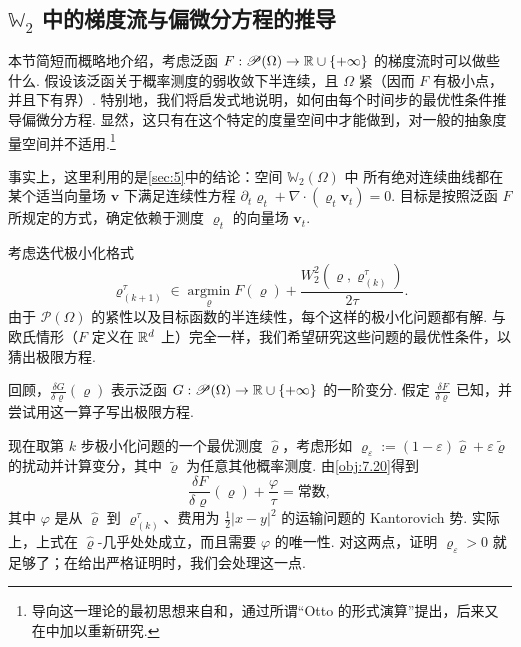 \subsection[Wasserstein 空间中的梯度流与偏微分方程的推导]{$\mathbb W_2$ 中的梯度流与偏微分方程的推导}\label{sec:8.2}
本节简短而概略地介绍，考虑泛函 $F:\mathscr P(\Omega)\to\mathbb R\cup\{+\infty\}$ 的梯度流时可以做些什么. 假设该泛函关于概率测度的弱收敛下半连续，且 $\Omega$ 紧（因而 $F$ 有极小点，并且下有界）. 特别地，我们将启发式地说明，如何由每个时间步的最优性条件推导偏微分方程. 显然，这只有在这个特定的度量空间中才能做到，对一般的抽象度量空间并不适用.\footnote{导向这一理论的最初思想来自\cite{b198}和\cite{b246}，通过所谓“Otto 的形式演算”提出，后来又在\cite{b15}中加以重新研究.}

事实上，这里利用的是\autoref{sec:5}中的结论：空间 $\mathbb W_2(\Omega)$ 中\label{idx:i27-p291}
所有绝对连续曲线都在某个适当向量场 $\mathbf v$ 下满足连续性方程 $\partial_t\varrho_t+\nabla\cdot(\varrho_t\mathbf v_t)=0$. 目标是按照泛函 $F$ 所规定的方式，确定依赖于测度 $\varrho_t$ 的向量场 $\mathbf v_t$.

考虑迭代极小化格式
\begin{equation}\label{eq:8.3}
\varrho_{(k+1)}^\tau\in\operatorname*{argmin}_{\varrho}
F(\varrho)+\frac{W_2^2(\varrho,\varrho_{(k)}^\tau)}{2\tau}.
\end{equation}
由于 $\mathscr P(\Omega)$ 的紧性以及目标函数的半连续性，每个这样的极小化问题都有解. 与欧氏情形（$F$ 定义在 $\mathbb R^d$ 上）完全一样，我们希望研究这些问题的最优性条件，以猜出极限方程.

回顾，$\frac{\delta G}{\delta\varrho}(\varrho)$ \label{idx:i62-p291}
表示泛函 $G:\mathscr P(\Omega)\to\mathbb R\cup\{+\infty\}$ 的一阶变分. 假定 $\frac{\delta F}{\delta\varrho}$ 已知，并尝试用这一算子写出极限方程.

现在取第 $k$ 步极小化问题的一个最优测度 $\widehat\varrho$，考虑形如 $\varrho_\varepsilon:=(1-\varepsilon)\widehat\varrho+\varepsilon\widetilde\varrho$ 的扰动并计算变分，其中 $\widetilde\varrho$ 为任意其他概率测度. 由\autoref{obj:7.20}得到
\[
\frac{\delta F}{\delta\varrho}(\varrho)+\frac\varphi\tau=\text{常数},
\]
其中 $\varphi$ 是从 $\widehat\varrho$ 到 $\varrho_{(k)}^\tau$、费用为 $\frac12|x-y|^2$ 的运输问题的 Kantorovich 势. 实际上，上式在 $\widehat\varrho$-几乎处处成立，而且需要 $\varphi$ 的唯一性. 对这两点，证明 $\varrho_\varepsilon>0$ 就足够了；在给出严格证明时，我们会处理这一点.


